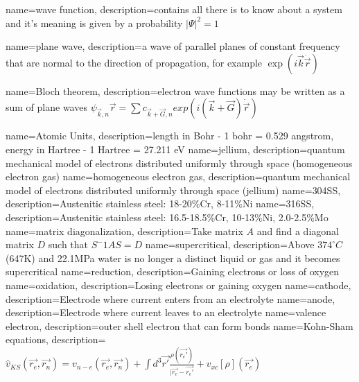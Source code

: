 {
    name={wave function},
    description={contains all there is to know about a system and it's meaning is given by a probability ${\lvert \Psi \rvert}^2 = 1 $}
}

{
    name={plane wave},
    description={a wave of parallel planes of constant frequency that are normal to the direction of propagation, for example $\exp(i\vec{k} \dot \vec{r})$}
}

{
    name={Bloch theorem},
    description={electron wave functions may be written as a sum of plane waves $\psi_{\vec{k},n} \vec{r} = \sum c_{\vec{k} + \vec{G}, n} exp(i (\vec{k} + \vec{G}) \dot \vec{r})$}
}

{
    name={Atomic Units},
    description={length in Bohr - 1 bohr = 0.529 angstrom, energy in Hartree - 1 Hartree = 27.211 eV}
}
{
    name={jellium},
    description={quantum mechanical model of electrons distributed uniformly through space (homogeneous electron gas)}
}
{
    name={homogeneous electron gas},
    description={quantum mechanical model of electrons distributed uniformly through space (jellium)}
}
{
    name={304SS},
    description={Austenitic stainless steel: 18-20\%Cr, 8-11\%Ni}
}
{
    name={316SS},
    description={Austenitic stainless steel: 16.5-18.5\%Cr, 10-13\%Ni, 2.0-2.5\%Mo}
}
{
    name={matrix diagonalization},
    description={Take matrix $A$ and find a diagonal matrix $D$ such that $S^-1 A S = D$}
}
{
    name=supercritical,
    description={Above $374^{\circ}C$ (647K) and 22.1MPa water is no longer a distinct liquid or gas and it becomes supercritical}
}
{
    name=reduction,
    description={Gaining electrons or loss of oxygen}
}
{
    name=oxidation,
    description={Losing electrons or gaining oxygen}
}
{
    name=cathode,
    description={Electrode where current enters from an electrolyte}
}
{
    name=anode,
    description={Electrode where current leaves to an electrolyte}
}
{
    name=valence electron,
    description={outer shell electron that can form bonds}
}
{
    name=Kohn-Sham equations,
    description={$\hat{v}_{KS}(\vec{r_e}, \vec{r_n}) = v_{n-e}(\vec{r_e}, \vec{r_n}) + \int d^3\vec{r'} \frac{\rho(\vec{r_{e}'})}{\lvert \vec{r_{e}} - \vec{r_{e}'}} + v_{xc}[\rho](\vec{r_{e}})$}
}
